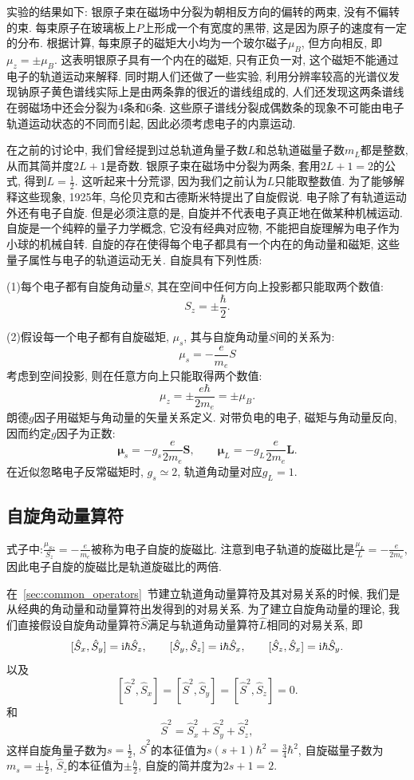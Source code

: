 实验的结果如下: 银原子束在磁场中分裂为朝相反方向的偏转的两束, 没有不偏转的束. 每束原子在玻璃板上$P$上形成一个有宽度的黑带, 这是因为原子的速度有一定的分布. 根据计算, 每束原子的磁矩大小均为一个玻尔磁子$\mu_B$, 但方向相反, 即$\mu_z = \pm \mu_B$. 这表明银原子具有一个内在的磁矩, 只有正负一对, 这个磁矩不能通过电子的轨道运动来解释. 同时期人们还做了一些实验, 利用分辨率较高的光谱仪发现钠原子黄色谱线实际上是由两条靠的很近的谱线组成的, 人们还发现这两条谱线在弱磁场中还会分裂为4条和6条. 这些原子谱线分裂成偶数条的现象不可能由电子轨道运动状态的不同而引起, 因此必须考虑电子的内禀运动.

在之前的讨论中, 我们曾经提到过总轨道角量子数$L$和总轨道磁量子数$m_L$都是整数, 从而其简并度$2L+1$是奇数. 银原子束在磁场中分裂为两条, 套用$2L+1=2$的公式, 得到$L=\frac{1}{2}$. 这听起来十分荒谬, 因为我们之前认为$L$只能取整数值. 为了能够解释这些现象, 1925年, 乌伦贝克和古德斯米特提出了自旋假说. 电子除了有轨道运动外还有电子自旋. 但是必须注意的是, 自旋并不代表电子真正地在做某种机械运动. 自旋是一个纯粹的量子力学概念, 它没有经典对应物, 不能把自旋理解为电子作为小球的机械自转. 自旋的存在使得每个电子都具有一个内在的角动量和磁矩, 这些量子属性与电子的轨道运动无关. 自旋具有下列性质:

(1)每个电子都有自旋角动量$S$, 其在空间中任何方向上投影都只能取两个数值:
\[
S_z = \pm \frac{\hbar}{2}.
\]

(2)假设每一个电子都有自旋磁矩, $\mu_s$, 其与自旋角动量$S$间的关系为:
\[
\mu_s = - \frac{e}{m_e} S
\]
考虑到空间投影, 则在任意方向上只能取得两个数值:
\[
\mu_z = \pm \frac{e\hbar}{2m_e} = \pm \mu_B.
\]
朗德$g$因子用磁矩与角动量的矢量关系定义. 对带负电的电子, 磁矩与角动量反向, 因而约定$g$因子为正数:
\[
\bm\mu_s=-g_s\frac{e}{2m_e}\bm S,\qquad \bm\mu_L=-g_L\frac{e}{2m_e}\bm L.
\]
在近似忽略电子反常磁矩时, $g_s\simeq2$, 轨道角动量对应$g_L=1$.

\subsection{自旋角动量算符}
式子中:$\frac{\mu_{Sz}}{S_z} = -\frac{e}{m_e}$被称为电子自旋的旋磁比. 注意到电子轨道的旋磁比是$\frac{\mu_L}{L} = -\frac{e}{2m_e}$, 因此电子自旋的旋磁比是轨道旋磁比的两倍.

在~\ref{sec:common_operators}~节建立轨道角动量算符及其对易关系的时候, 我们是从经典的角动量和动量算符出发得到的对易关系. 为了建立自旋角动量的理论, 我们直接假设自旋角动量算符$\hat S$满足与轨道角动量算符$\hat L$相同的对易关系, 即
\[
[\hat S_x, \hat S_y] = \mathop{}\!\mathrm{i}\hbar \hat S_z,
\qquad
[\hat S_y, \hat S_z] = \mathop{}\!\mathrm{i}\hbar \hat S_x,
\qquad
[\hat S_z, \hat S_x] = \mathop{}\!\mathrm{i}\hbar \hat S_y.
\]
以及
\[
[\hat S^2, \hat S_x] = [\hat S^2, \hat S_y] = [\hat S^2, \hat S_z] = 0.
\]
和
\[
\hat S^2 = \hat S_x^2 + \hat S_y^2 + \hat S_z^2,
\]
这样自旋角量子数为$s=\frac{1}{2}$, $\hat S^2$的本征值为$s(s+1)\hbar^2=\frac{3}{4}\hbar^2$, 自旋磁量子数为$m_s = \pm \frac{1}{2}$, $\hat S_z$的本征值为$\pm \frac{\hbar}{2}$, 自旋的简并度为$2s+1=2$.

